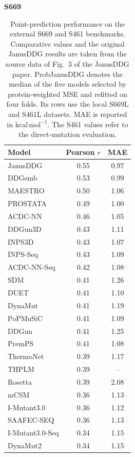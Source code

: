 \documentclass[11pt]{article}
\begin{document}
\begin{table}[h]
\centering
\caption{Point-prediction performance on the external S669 and S461
benchmarks. Comparative values and the original JanusDDG results are taken
from the source data of Fig.~3 of the JanusDDG paper. ProbJanusDDG denotes
the median of the five models selected by protein-weighted MSE and refitted on four folds. Its rows use the local S669L and S461L datasets. MAE is reported in \(\mathrm{kcal\,mol^{-1}}\). The S461 values refer to the
direct-mutation evaluation.}
\label{tab:point}
\scriptsize
\setlength{\tabcolsep}{3.5pt}
\begin{minipage}[t]{0.485\textwidth}
\centering
\textbf{S669}\\[2pt]
\begin{tabular}{lcc}
\toprule
Model & Pearson \(r\) & MAE \\
\midrule
JanusDDG          & 0.55 & 0.97 \\
DDGemb            & 0.53 & 0.99 \\
MAESTRO           & 0.50 & 1.06 \\
PROSTATA          & 0.49 & 1.00 \\
ACDC-NN           & 0.46 & 1.05 \\
DDGun3D           & 0.43 & 1.11 \\
INPS3D            & 0.43 & 1.07 \\
INPS-Seq          & 0.43 & 1.09 \\
ACDC-NN-Seq       & 0.42 & 1.08 \\
SDM               & 0.41 & 1.26 \\
DUET              & 0.41 & 1.10 \\
DynaMut           & 0.41 & 1.19 \\
PoPMuSiC          & 0.41 & 1.09 \\
DDGun             & 0.41 & 1.25 \\
PremPS            & 0.41 & 1.08 \\
ThermoNet         & 0.39 & 1.17 \\
THPLM             & 0.39 & --   \\
Rosetta           & 0.39 & 2.08 \\
mCSM              & 0.36 & 1.13 \\
I-Mutant3.0       & 0.36 & 1.12 \\
SAAFEC-SEQ        & 0.36 & 1.13 \\
I-Mutant3.0-Seq   & 0.34 & 1.15 \\
DynaMut2          & 0.34 & 1.15 \\

\end{tabular}
\end{minipage}
\end{table}
\end{document}
